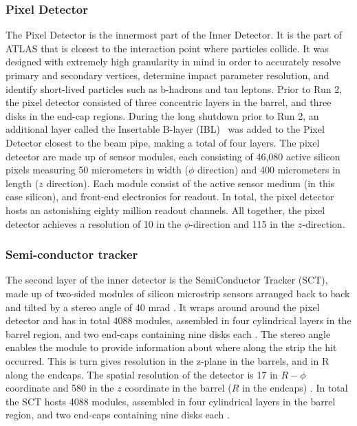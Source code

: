 \subsubsection{Pixel Detector}

The Pixel Detector is the innermost part of the Inner Detector. It is the part of ATLAS that is closest to the interaction point where particles collide. It was designed with extremely high granularity in mind in order to accurately resolve primary and secondary vertices, determine impact parameter resolution, and identify short-lived particles such as b-hadrons and tau leptons. Prior to Run 2, the pixel detector consisted of three concentric layers in the barrel, and three disks in the end-cap regions. During the long shutdown prior to Run 2, an additional layer called the Insertable B-layer (IBL)~\cite{Capeans:1291633} was added to the Pixel Detector closest to the beam pipe, making a total of four layers. The pixel detector are made up of sensor modules, each consisting of 46,080 active silicon pixels measuring 50 micrometers in width ($\phi$ direction) and 400 micrometers in length ($z$ direction). Each module consist of the active sensor medium (in this case silicon), and front-end electronics for readout. In total, the pixel detector hosts an astonishing eighty million readout channels. All together, the pixel detector achieves a resolution of \unit{10}{\micro\meter} in the $\phi$-direction and \unit{115}{\micro\meter} in the $z$-direction.

\subsubsection{Semi-conductor tracker}

The second layer of the inner detector is the SemiConductor Tracker (SCT), made up of two-sided modules of silicon microstrip sensors arranged back to back and tilted by a stereo angle of 40 mrad \cite{AHMAD200798}. It wraps around around the pixel detector and has in total 4088 modules, assembled in four cylindrical layers in the barrel region, and two end-caps containing nine disks each \cite{CERN-LHCC-2017-005}. The stereo angle enables the module to provide information about where along the strip the hit occurred. This is turn gives resolution in the z-plane in the barrels, and in R along the endcaps. The spatial resolution of the detector is \unit{17}{\mu\meter} in $R-\phi$ coordinate and \unit{580}{\mu\meter} in the $z$ coordinate in the barrel ($R$ in the endcaps) \cite{Abdesselam:974073}. In total the SCT hosts 4088 modules, assembled in four cylindrical layers in the barrel region, and two end-caps containing nine disks each \cite{CERN-LHCC-2017-005}. 

